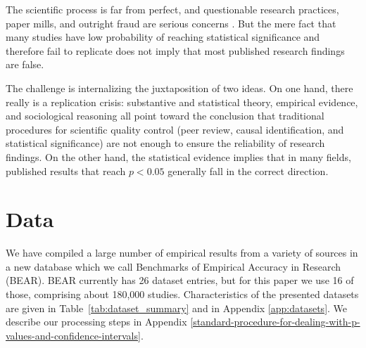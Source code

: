\documentclass[11pt]{article}
\begin{document}
The scientific process is far from perfect, and questionable research practices, paper mills, and outright fraud are serious concerns \parencite{aquarius2025tackling,matusz2025threat}. But the mere fact that many studies have low probability of reaching statistical significance and therefore fail to replicate does not imply that most published research findings are false. 

The challenge is internalizing the juxtaposition of two ideas.  On one hand, there really is a replication crisis:  substantive and statistical theory, empirical evidence, and sociological reasoning all point toward the conclusion that traditional procedures for scientific quality control (peer review, causal identification, and statistical significance) are not enough to ensure the reliability of research findings.  On the other hand, the statistical evidence implies that in many fields, published results that reach $p<0.05$ generally fall in the correct direction.



\section{Data}

We have compiled a large number of empirical results from a variety of sources in a new database which we call Benchmarks of Empirical Accuracy in Research (BEAR). BEAR currently has 26 dataset entries, but for this paper we use 16 of those, comprising about 180,000 studies. Characteristics of the presented datasets are given in Table~\ref{tab:dataset_summary} and in Appendix \ref{app:datasets}. We describe our processing steps in Appendix \ref{standard-procedure-for-dealing-with-p-values-and-confidence-intervals}.
\end{document}
